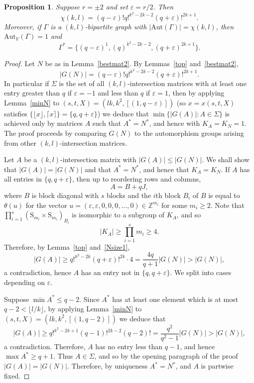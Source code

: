 \documentclass{daj}
\renewcommand\S{\mathrm{S}}
\newcommand\Aut{\mathrm{Aut}}
\theoremstyle{plain}
\newtheorem{proposition}[theorem]{Proposition}
\theoremstyle{definition}
\begin{document}
\begin{proposition}\label{2}
Suppose $r=\pm2$ and set $\varepsilon=r/2$. Then $$\chi(k,l)=(q-\varepsilon)!q!^{k^2-2k-2}(q+\varepsilon)!^{2k+1}.$$ Moreover, if $\Gamma$ is a $(k,l)$-bipartite graph with $|\Aut(\Gamma)|=\chi(k,l)$, then $\Aut_V(\Gamma)=1$ and $$\Gamma^*=\{(q-\varepsilon)^1,(q)^{k^2-2k-2},(q+\varepsilon)^{2k+1}\}.$$
\end{proposition}
\begin{proof}
Let $N$ be as in Lemma~\ref{bestmat2}. By Lemmas~\ref{top} and~\ref{bestmat2}, \begin{equation}\label{Nsize1} |G(N)|=(q-\varepsilon)!q!^{k^2-2k-2}(q+\varepsilon)!^{2k+1}.\end{equation} In particular if $\Sigma$ is the set of all $(k,l)$-intersection matrices with at least one entry greater than $q$ if $\varepsilon=-1$ and less than $q$ if $\varepsilon=1$, then by applying Lemma~\ref{minN} to $(s,t,X)=(lk,k^2,[(1,q-\varepsilon)])$ (so $x=x(s,t,X)$ satisfies $\{\lfloor x\rfloor,\lceil x\rceil\}=\{q,q+\varepsilon\}$) we deduce that $\min \{|G(A)| : A\in \Sigma\}$ is achieved only by matrices $A$ such that $A^*=N^*$, and hence with $K_A=K_N=1$. 
The proof proceeds by comparing $G(N)$ to the automorphism groups arising from other $(k,l)$-intersection matrices.

Let $A$ be a $(k,l)$-intersection matrix with $|G(A)|\leq |G(N)|$. We shall show that $|G(A)|=|G(N)|$ and that $A^*=N^*$, and hence that $K_A=K_N$. If $A$ has all entries in $\{q,q+\varepsilon\}$, then up to reordering rows and columns, $$A=B+qJ,$$ where $B$ is block diagonal with $s$ blocks and the $i$th block $B_i$ of $B$ is equal to $\theta(u)$ for the vector $u=(\varepsilon,\varepsilon,0,0,0,\dots,0)\in\mathbb{Z}^{m_i}$ for some $m_i\geq 2$. Note that $\prod_{i=1}^s (\S_{m_i}\times\S_{m_i})_{B_i}$ is isomorphic to a subgroup of $K_A$, and so $$|K_A|\geq \prod_{i=1}^s m_i\geq 4.$$ Therefore, by Lemma~\ref{top} and~\eqref{Nsize1}, $$|G(A)|\geq q!^{k^2-2k}(q+\varepsilon)!^{2k}\cdot 4=\frac{4q}{q+1}|G(N)|>|G(N)|,$$ a contradiction, hence $A$ has an entry not in $\{q,q+\varepsilon\}$. We split into cases depending on $\varepsilon$.

\vspace{11pt} Suppose $\min A^*\leq q-2$. Since $A^*$ has at least one element which is at most $q-2<\lfloor l/k\rfloor$, by applying Lemma~\ref{minN} to $(s,t,X)=(lk,k^2,[(1,q-2)])$ 
we deduce that $$|G(A)|\geq q!^{k^2-2k+1}(q-1)!^{2k-2}(q-2)!=\frac{q^2}{q^2-1}|G(N)|>|G(N)|,$$ a contradiction. Therefore, $A$ has no entry less than $q-1$, and hence $\max A^*\geq q+1$. Thus $A\in \Sigma$, and so by the opening paragraph of the proof $|G(A)|=|G(N)|$. Therefore, by uniqueness $A^*=N^*$, and $A$ is partwise fixed. 


\end{proof}
\end{document}
